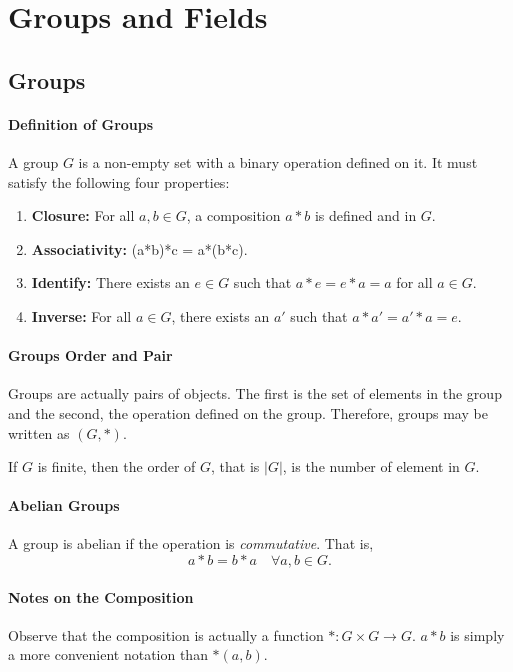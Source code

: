 
\section{Groups and Fields}

\subsection{Groups}

\paragraph{Definition of Groups}
A group \(G\) is a non-empty set with a binary operation defined on it.
It must satisfy the following four properties:
\begin{enumerate}
    \item \textbf{Closure:} For all \(a, b \in G\), a composition \(a*b\) is
    defined and in \(G\).
    \item \textbf{Associativity:} (a*b)*c = a*(b*c).
    \item \textbf{Identify:} There exists an \(e\in G\) such that
    \(a*e = e*a = a\)  for all \(a\in G\).
    \item \textbf{Inverse:} For all \(a \in G\), there exists an \(a'\)
    such that \(a*a' = a'*a = e\).
\end{enumerate}

\paragraph{Groups Order and Pair}
Groups are actually pairs of objects. The first is the set of elements in
the group and the second, the operation defined on the group.
Therefore, groups may be written as \((G, *)\).

If \(G\) is finite, then the order of \(G\), that is \(|G|\), is the
number of element in \(G\).

\paragraph{Abelian Groups}
A group is abelian if the operation is \textit{commutative}.
That is,
\[a*b = b*a \quad \forall a,b\in G.\]

\paragraph{Notes on the Composition}

Observe that the composition is actually a function \(*: G\times G \to G\).
\(a*b\) is simply a more convenient notation than \(*(a, b)\).

